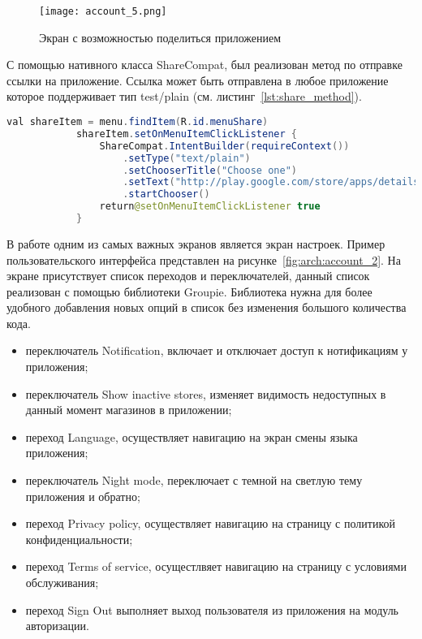 \begin{figure}[H]
 \centering
   \texttt{[image: account\_5.png]} 
   \caption{Экран с возможностью поделиться приложением}
   \label{fig:arch:account_5}
\end{figure}

С помощью нативного класса ShareCompat, был реализован метод по отправке ссылки на приложение. Ссылка может быть отправлена в любое приложение которое поддерживает тип test/plain (см. листинг~\ref{lst:share_method}).
\begin{lstlisting}[language=Java,label={lst:share_method},caption={Методы для отправки ссылки на приложение}]
            val shareItem = menu.findItem(R.id.menuShare)
            shareItem.setOnMenuItemClickListener {
                ShareCompat.IntentBuilder(requireContext())
                    .setType("text/plain")
                    .setChooserTitle("Choose one")
                    .setText("http://play.google.com/store/apps/details?id=" + requireActivity().packageName)
                    .startChooser()
                return@setOnMenuItemClickListener true
            }
\end{lstlisting}

В работе одним из самых важных экранов является экран настроек. Пример пользовательского интерфейса представлен на рисунке~\ref{fig:arch:account_2}. На экране присутствует список переходов и переключателей, данный список реализован с помощью библиотеки Groupie. Библиотека нужна для более удобного добавления новых опций в список без изменения большого количества кода.

\begin{itemize}
    \item переключатель Notification, включает и отключает доступ к нотификациям у приложения;
    \item переключатель Show inactive stores, изменяет видимость недоступных в данный момент магазинов в приложении;
    \item переход Language, осуществляет навигацию на экран смены языка приложения;
    \item переключатель Night mode, переключает с темной на светлую тему приложения и обратно;
    \item переход Privacy policy, осуществляет навигацию на страницу с политикой конфиденциальности;
    \item переход Terms of service, осущестлвяет навигацию на страницу с условиями обслуживания;
    \item переход Sign Out выполняет выход пользователя из приложения на модуль авторизации.
\end{itemize}

